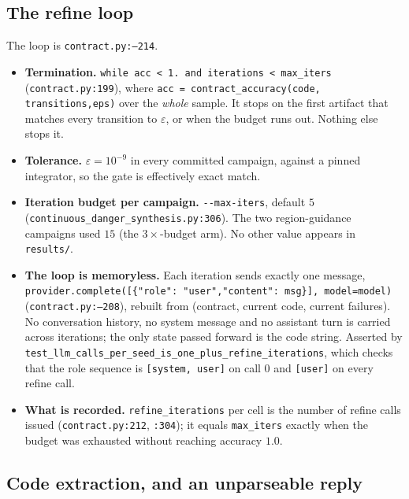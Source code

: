 \subsection{The refine loop}
\label{app:proto-refine}

The loop is \texttt{contract.\allowbreak py:--214}.

\begin{itemize}
\item \textbf{Termination.} \texttt{while acc < 1. and iterations < max\_\allowbreak iters}
(\texttt{contract.py:199}), where \texttt{acc = contract\_\allowbreak accuracy(code,\allowbreak 
transitions,\allowbreak  eps)\allowbreak } over the \emph{whole} sample. It stops on the first artifact
that matches every transition to $\varepsilon$, or when the budget runs out.
Nothing else stops it.
\item \textbf{Tolerance.} $\varepsilon = 10^{-9}$ in every committed campaign,
against a pinned integrator, so the gate is effectively exact match.
\item \textbf{Iteration budget per campaign.} \texttt{-{}-max-iters}, default
$5$ (\texttt{continuous\_\allowbreak danger\_\allowbreak synthesis.\allowbreak py:306}). The two region-guidance
campaigns used $15$ (the $3\times$-budget arm). No other value appears in
\texttt{results/}.
\item \textbf{The loop is memoryless.} Each iteration sends exactly one message,
\texttt{provider.\allowbreak complete([\{"role": "user",\allowbreak  "content": msg\}], model=model)}
(\texttt{contract.\allowbreak py:--208}), rebuilt from (contract, current code, current
failures). No conversation history, no system message and no assistant turn is
carried across iterations; the only state passed forward is the code string.
Asserted by
\texttt{test\_\allowbreak llm\_\allowbreak calls\_\allowbreak per\_\allowbreak seed\_\allowbreak is\_\allowbreak one\_\allowbreak plus\_\allowbreak refine\_\allowbreak iterations}, which
checks that the role sequence is \texttt{[system, user]} on call $0$ and
\texttt{[user]} on every refine call.
\item \textbf{What is recorded.} \texttt{refine\_\allowbreak iterations} per cell is the
number of refine calls issued (\texttt{contract.py:212}, \texttt{:304}); it
equals \texttt{max\_iters} exactly when the budget was exhausted without
reaching accuracy $1.0$.
\end{itemize}

\subsection{Code extraction, and an unparseable reply}
\label{app:proto-extract}

